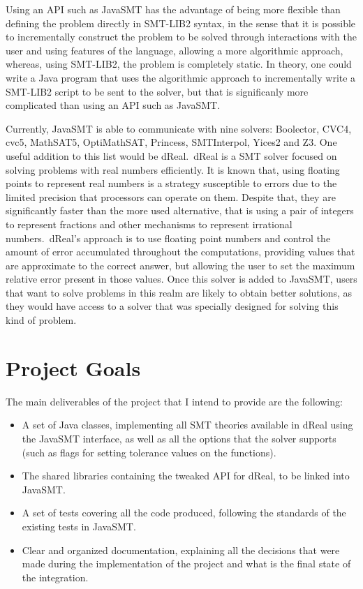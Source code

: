 \documentclass[a4paper,12pt]{article}
\begin{document}
Using an API such as JavaSMT has the advantage of being more flexible than defining the problem directly in SMT-LIB2 syntax, in the sense that it is possible to incrementally construct the problem to be solved through interactions with the user and using features of the language, allowing a more algorithmic approach, whereas, using SMT-LIB2, the problem is completely static. In theory, one could write a Java program that uses the algorithmic approach to incrementally write a SMT-LIB2 script to
be sent to the solver, but that is significanly more complicated than using an API such as JavaSMT.\

Currently, JavaSMT is able to communicate with nine solvers: Boolector, CVC4, cvc5, MathSAT5, OptiMathSAT, Princess, SMTInterpol, Yices2 and Z3. One useful addition to this
list would be dReal.\ dReal is a SMT solver focused on solving problems with real numbers efficiently. It is known that, using floating points to represent real numbers is a strategy susceptible to errors due to the limited precision that processors can operate on them. Despite that, they are significantly faster than the more used alternative, that is using a pair of integers to represent fractions and other mechanisms to represent irrational numbers.\ dReal's approach is to use floating point numbers and control the amount of error accumulated throughout the computations, providing values that are approximate to the correct answer, but allowing the user to set the maximum relative error present in those values. Once this solver is added to JavaSMT, users that want to solve problems in this realm are likely to obtain better solutions, as they would have access to a solver that was specially designed for solving this kind of problem.

\section{Project Goals}

The main deliverables of the project that I intend to provide are the following:

\begin{itemize}
  \item A set of Java classes, implementing all SMT theories available in dReal using the JavaSMT interface, as well as all the options that the solver supports (such as flags for setting tolerance values on the functions).
  \item The shared libraries containing the tweaked API for dReal, to be linked into JavaSMT.\
  \item A set of tests covering all the code produced, following the standards of the existing tests in JavaSMT.\
  \item Clear and organized documentation, explaining all the decisions that were made during the implementation of the project and what is the final state of the integration.
\end{itemize}
\end{document}
